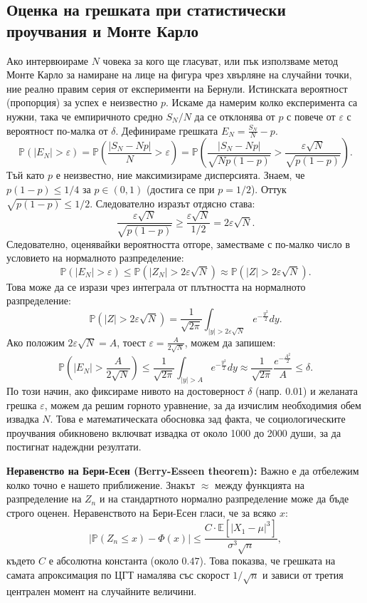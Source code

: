\documentclass{article}
\begin{document}
\subsection{Оценка на грешката при статистически проучвания и Монте Карло}
Ако интервюираме $N$ човека за кого ще гласуват, или пък използваме метод Монте Карло за намиране на лице на фигура чрез хвърляне на случайни точки, ние реално правим серия от експерименти на Бернули. Истинската вероятност (пропорция) за успех е неизвестно $p$.
Искаме да намерим колко експеримента са нужни, така че емпиричното средно $S_N/N$ да се отклонява от $p$ с повече от $\varepsilon$ с вероятност по-малка от $\delta$. Дефинираме грешката $E_N = \frac{S_N}{N} - p$.
\[ \mathbb{P}(|E_N| > \varepsilon) = \mathbb{P}\left( \frac{|S_N - Np|}{N} > \varepsilon \right) = \mathbb{P}\left( \frac{|S_N - Np|}{\sqrt{N p(1-p)}} > \frac{\varepsilon \sqrt{N}}{\sqrt{p(1-p)}} \right). \]
Тъй като $p$ е неизвестно, ние максимизираме дисперсията. Знаем, че $p(1-p) \le 1/4$ за $p \in (0,1)$ (достига се при $p=1/2$). Оттук $\sqrt{p(1-p)} \le 1/2$. Следователно изразът отдясно става:
\[ \frac{\varepsilon \sqrt{N}}{\sqrt{p(1-p)}} \ge \frac{\varepsilon \sqrt{N}}{1/2} = 2\varepsilon\sqrt{N}. \]
Следователно, оценявайки вероятността отгоре, заместваме с по-малко число в условието на нормалното разпределение:
\[ \mathbb{P}(|E_N| > \varepsilon) \le \mathbb{P}(|Z_N| > 2\varepsilon\sqrt{N}) \approx \mathbb{P}(|Z| > 2\varepsilon\sqrt{N}). \]
Това може да се изрази чрез интеграла от плътността на нормалното разпределение:
\[ \mathbb{P}(|Z| > 2\varepsilon\sqrt{N}) = \frac{1}{\sqrt{2\pi}} \int_{|y| > 2\varepsilon\sqrt{N}} e^{-\frac{y^2}{2}} dy. \]
Ако положим $2\varepsilon\sqrt{N} = A$, тоест $\varepsilon = \frac{A}{2\sqrt{N}}$, можем да запишем:
\[ \mathbb{P}\left(|E_N| > \frac{A}{2\sqrt{N}}\right) \le \frac{1}{\sqrt{2\pi}} \int_{|y|>A} e^{-\frac{y^2}{2}} dy \approx \frac{1}{\sqrt{2\pi}} \frac{e^{-\frac{A^2}{2}}}{A} \le \delta. \]
По този начин, ако фиксираме нивото на достоверност $\delta$ (напр. 0.01) и желаната грешка $\varepsilon$, можем да решим горното уравнение, за да изчислим необходимия обем извадка $N$. Това е математическата обосновка зад факта, че социологическите проучвания обикновено включват извадка от около 1000 до 2000 души, за да постигнат надеждни резултати.

\textbf{Неравенство на Бери-Есен (Berry-Esseen theorem):} 
Важно е да отбележим колко точно е нашето приближение. Знакът $\approx$ между функцията на разпределение на $Z_n$ и на стандартното нормално разпределение може да бъде строго оценен. Неравенството на Бери-Есен гласи, че за всяко $x$:
\[ \left| \mathbb{P}(Z_n \le x) - \Phi(x) \right| \le \frac{C \cdot \mathbb{E}[|X_1 - \mu|^3]}{\sigma^3 \sqrt{n}}, \]
където $C$ е абсолютна константа (около $0.47$). Това показва, че грешката на самата апроксимация по ЦГТ намалява със скорост $1/\sqrt{n}$ и зависи от третия централен момент на случайните величини.
\end{document}
